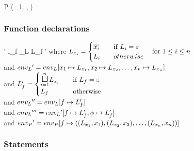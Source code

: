         {}
        { \quad
          }
        {}
\begin{trules}
        { {P} {(\ienvL_1, \icstr, \ienvP)} }
        {\ienvP \vdash {}}
        {}
\end{trules}

\subsubsection{Function declarations}

        {}
        {
          {\ienvL' \vdash l_f \rightarrow_L L_f \quad \ienvP' \vdash {}}}
        {where $L_{x_i} = \begin{cases}
          \overline{x_i} & \quad \text{if } L_i = \varepsilon \\
          L_i & \quad otherwise
        \end{cases}\quad \text{for } 1 \leq i \leq n$ \\
          and ${env_L}' = {env_L}[x_1 \mapsto L_{x_1}, x_2 \mapsto L_{x_2}, \dots, x_n \mapsto L_{x_n}]$ \\
          and $L_f' = \begin{cases}
            \mathlarger\sqcupl_{i = 1}^n L_{x_i} & \quad \text{if } L_f = \varepsilon \\
            L_f & \quad \text{otherwise}
        \end{cases}$ \\
          and ${env_L}'' = {env_L}[f \mapsto L_f']$ \\
          and ${env_L}''' = {env_L}'[f \mapsto L_f', \phi \mapsto L_f']$\\
          and ${env_P}' = {env_P}[f \mapsto ((L_{x_1}, x_1), (L_{x_2}, x_2), \dots, (L_{x_n}, x_n))]$}

\subsubsection{Statements}


